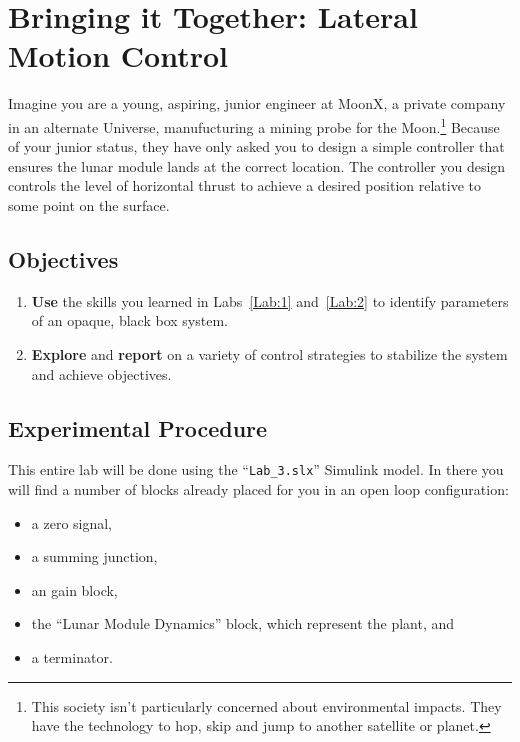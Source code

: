 \chapter{Bringing it Together: Lateral Motion Control}\label{Lab:3}
Imagine you are a young, aspiring, junior engineer at MoonX, a
private company in an alternate Universe, manufucturing a mining probe for the
Moon.\footnote{This society isn't particularly concerned about environmental
impacts. They have the technology to hop, skip and jump to another satellite
or planet.} Because of your junior status, they have only asked you to design
a simple controller that ensures the lunar module lands at the correct
location. The controller you design controls the level of horizontal thrust
to achieve a desired position relative to some point on the surface.

\section{Objectives}
\begin{enumerate}[label=(\arabic*)]
  \item{
    \textbf{Use} the skills you learned in Labs~\ref{Lab:1} and~\ref{Lab:2}
    to identify parameters of an opaque, black box system.
  }
  \item{
    \textbf{Explore} and \textbf{report} on a variety of control strategies
    to stabilize the system and achieve objectives.
  }
\end{enumerate}

\section{Experimental Procedure}
This entire lab will be done using the ``\texttt{Lab\_3.slx}'' Simulink model.
In there you will find a number of blocks already placed for you in an open
loop configuration:
\begin{itemize}
  \item{a zero signal,}
  \item{a summing junction,}
  \item{an gain block,}
  \item{the ``Lunar Module Dynamics'' block, which represent the plant, and}
  \item{a terminator.}
\end{itemize}
%
